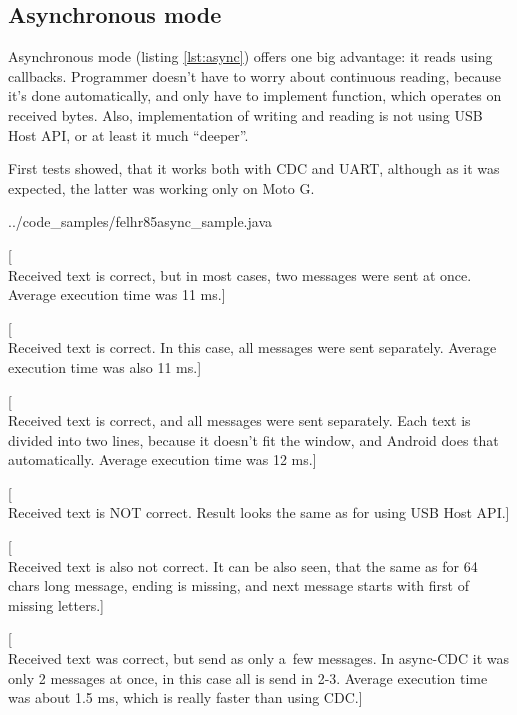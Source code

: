 \subsection{Asynchronous mode}
Asynchronous mode (listing \ref{lst:async}) offers one big advantage: it reads
using callbacks.
Programmer doesn't have to worry about continuous reading, because it's done
automatically, and only have to implement function, which operates on received
bytes.
Also, implementation of writing and reading is not using USB Host API, or at
least it much ``deeper''.

First tests showed, that it works both with CDC and UART, although as it was
expected, the latter was working only on Moto G.


{../code_samples/felhr85async_sample.java}

[\\Received text is correct, but in most cases, two messages were sent at once.
Average execution time was 11 ms.]

[\\Received text is correct. 
In this case, all messages were sent separately.
Average execution time was also 11 ms.]


[\\Received text is correct, and all messages were sent separately.
Each text is divided into two lines, because it doesn't fit the window, and
Android does that automatically.
Average execution time was 12 ms.]

[\\Received text is  NOT correct.
Result looks the same as for using USB Host API.]

[\\Received text is also not correct.
It can be also seen, that the same as for 64 chars long message, ending is
missing, and next message starts with first of missing letters.]

[\\Received text was correct, but send as only a~few messages. 
In async-CDC it was only 2 messages at once, in this case all is send in 2-3.
Average execution time was about 1.5 ms, which is really faster than using CDC.]

